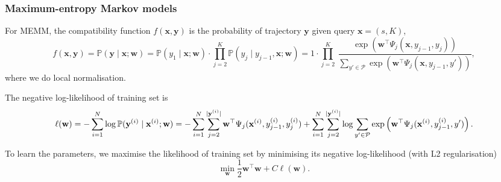 \subsubsection{Maximum-entropy Markov models}
\label{sec:memm}

For MEMM, the compatibility function $f(\mathbf{x}, \mathbf{y})$ is the probability of trajectory $\mathbf{y}$ given query $\mathbf{x} = (s, K)$,
\begin{equation*}
f(\mathbf{x}, \mathbf{y}) 
= \mathbb{P}(\mathbf{y} \mid \mathbf{x}; \mathbf{w}) 
= \mathbb{P}(y_1 \mid \mathbf{x}; \mathbf{w}) \cdot \prod_{j=2}^K \mathbb{P}(y_j \mid y_{j-1}, \mathbf{x}; \mathbf{w})
= 1 \cdot \prod_{j=2}^{K}~
  \frac{\exp \left(\mathbf{w}^\top \Psi_j(\mathbf{x}, y_{j-1}, y_j) \right)}
       {\sum_{y' \in \mathcal{P}} \exp \left(\mathbf{w}^\top \Psi_j(\mathbf{x}, y_{j-1}, y') \right)},
\end{equation*}
where we do local normalisation.

The negative log-likelihood of training set is
\begin{equation*}
\ell(\mathbf{w}) 
= -\sum_{i=1}^N \log \mathbb{P}(\mathbf{y}^{(i)} \mid \mathbf{x}^{(i)}; \mathbf{w}) \\
= -\sum_{i=1}^N \sum_{j=2}^{\mid \mathbf{y}^{(i)} \mid} 
                \mathbf{w}^\top \Psi_j(\mathbf{x}^{(i)}, y_{j-1}^{(i)}, y_j^{(i)}) +
   \sum_{i=1}^N \sum_{j=2}^{\mid \mathbf{y}^{(i)} \mid} 
                \log \sum_{y' \in \mathcal{P}} \exp \left(\mathbf{w}^\top \Psi_j(\mathbf{x}^{(i)}, y_{j-1}^{(i)}, y') \right).
\end{equation*}

To learn the parameters, we maximise the likelihood of training set by minimising its negative log-likelihood (with L2 regularisation)
\begin{equation}
\label{eq:trainmemm}
\min_{\mathbf{w}} \frac{1}{2} \mathbf{w}^\top \mathbf{w} + C \ell(\mathbf{w}).
\end{equation}

